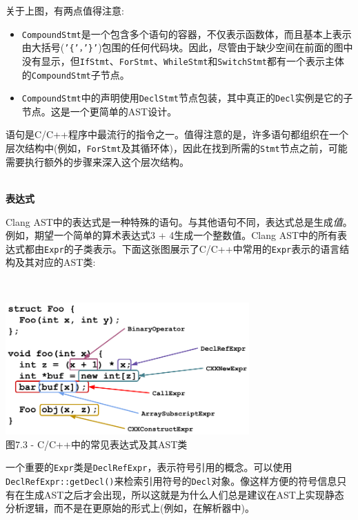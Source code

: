关于上图，有两点值得注意:

\begin{itemize}
\item \texttt{CompoundStmt}是一个包含多个语句的容器，不仅表示函数体，而且基本上表示由大括号(\texttt{'\{'，'\}'})包围的任何代码块。因此，尽管由于缺少空间在前面的图中没有显示，但\texttt{IfStmt}、\texttt{ForStmt}、\texttt{WhileStmt}和\texttt{SwitchStmt}都有一个表示主体的\texttt{CompoundStmt}子节点。

\item \texttt{CompoundStmt}中的声明使用\texttt{DeclStmt}节点包装，其中真正的\texttt{Decl}实例是它的子节点。这是一个更简单的AST设计。
\end{itemize}

语句是C/C++程序中最流行的指令之一。值得注意的是，许多语句都组织在一个层次结构中(例如，\texttt{ForStmt}及其循环体)，因此在找到所需的\texttt{Stmt}节点之前，可能需要执行额外的步骤来深入这个层次结构。

\hspace*{\fill} \\ %
\noindent
\textbf{表达式}

Clang AST中的表达式是一种特殊的语句。与其他语句不同，表达式总是生成\textit{值}。例如，期望一个简单的算术表达式3 + 4生成一个整数值。Clang AST中的所有表达式都由\texttt{Expr}的子类表示。下面这张图展示了C/C++中常用的\texttt{Expr}表示的语言结构及其对应的AST类:

\hspace*{\fill} \\ %
\begin{center}
\includegraphics[width=0.7\textwidth]{content/2/chapter7/images/3.png}\\
图7.3 - C/C++中的常见表达式及其AST类
\end{center}

一个重要的\texttt{Expr}类是\texttt{DeclRefExpr}，表示符号引用的概念。可以使用\texttt{DeclRefExpr::getDecl()}来检索引用符号的\texttt{Decl}对象。像这样方便的符号信息只有在生成AST之后才会出现，所以这就是为什么人们总是建议在AST上实现静态分析逻辑，而不是在更原始的形式上(例如，在解析器中)。

